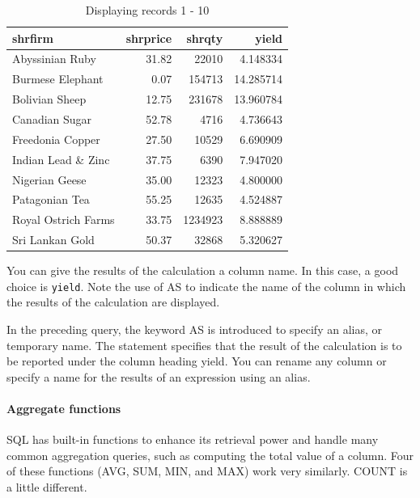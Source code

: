 \documentclass[
]{article}
\begin{document}
\begin{table}

\caption{\label{tab:unnamed-chunk-20}Displaying records 1 - 10}
\centering
\begin{tabular}[t]{l|r|r|r}
\hline
shrfirm & shrprice & shrqty & yield\\
\hline
Abyssinian Ruby & 31.82 & 22010 & 4.148334\\
\hline
Burmese Elephant & 0.07 & 154713 & 14.285714\\
\hline
Bolivian Sheep & 12.75 & 231678 & 13.960784\\
\hline
Canadian Sugar & 52.78 & 4716 & 4.736643\\
\hline
Freedonia Copper & 27.50 & 10529 & 6.690909\\
\hline
Indian Lead \& Zinc & 37.75 & 6390 & 7.947020\\
\hline
Nigerian Geese & 35.00 & 12323 & 4.800000\\
\hline
Patagonian Tea & 55.25 & 12635 & 4.524887\\
\hline
Royal Ostrich Farms & 33.75 & 1234923 & 8.888889\\
\hline
Sri Lankan Gold & 50.37 & 32868 & 5.320627\\
\hline
\end{tabular}
\end{table}

You can give the results of the calculation a column name. In this case, a good choice is \texttt{yield}. Note the use of AS to indicate the name of the column in which the results of the calculation are displayed.

In the preceding query, the keyword AS is introduced to specify an alias, or temporary name. The statement specifies that the result of the calculation is to be reported under the column heading yield. You can rename any column or specify a name for the results of an expression using an alias.

\hypertarget{aggregate-functions}{%
\paragraph*{Aggregate functions}\label{aggregate-functions}}

SQL has built-in functions to enhance its retrieval power and handle many common aggregation queries, such as computing the total value of a column. Four of these functions (AVG, SUM, MIN, and MAX) work very similarly. COUNT is a little different.
\end{document}
